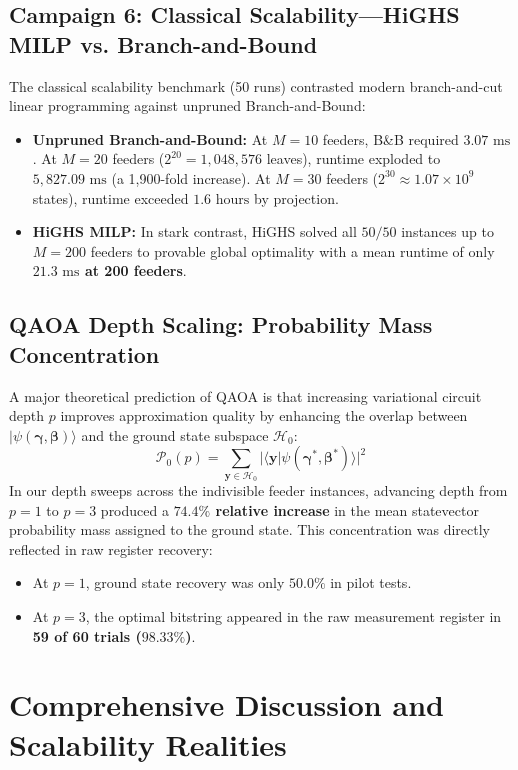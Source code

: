 \documentclass[11pt,a4paper]{article}
\theoremstyle{definition}
\theoremstyle{remark}
\begin{document}
\subsection{Campaign 6: Classical Scalability---HiGHS MILP vs. Branch-and-Bound}
The classical scalability benchmark (50 runs) contrasted modern branch-and-cut linear programming against unpruned Branch-and-Bound:
\begin{itemize}
    \item \textbf{Unpruned Branch-and-Bound:} At $M = 10$ feeders, B\&B required $3.07\text{ ms}$. At $M = 20$ feeders ($2^{20} = 1,048,576$ leaves), runtime exploded to $5,827.09\text{ ms}$ (a 1,900-fold increase). At $M = 30$ feeders ($2^{30} \approx 1.07 \times 10^9$ states), runtime exceeded $1.6\text{ hours}$ by projection.
    \item \textbf{HiGHS MILP:} In stark contrast, HiGHS solved all $50/50$ instances up to $M = 200$ feeders to provable global optimality with a mean runtime of only \textbf{$21.3\text{ ms}$ at 200 feeders}.
\end{itemize}

\subsection{QAOA Depth Scaling: Probability Mass Concentration}
A major theoretical prediction of QAOA is that increasing variational circuit depth $p$ improves approximation quality by enhancing the overlap between $|\psi(\boldsymbol{\gamma}, \boldsymbol{\beta})\rangle$ and the ground state subspace $\mathcal{H}_0$:
\begin{equation}
\mathcal{P}_0(p) = \sum_{\mathbf{y} \in \mathcal{H}_0} |\langle \mathbf{y} | \psi(\boldsymbol{\gamma}^*, \boldsymbol{\beta}^*) \rangle|^2
\end{equation}
In our depth sweeps across the indivisible feeder instances, advancing depth from $p = 1$ to $p = 3$ produced a \textbf{$74.4\%$ relative increase} in the mean statevector probability mass assigned to the ground state. This concentration was directly reflected in raw register recovery:
\begin{itemize}
    \item At $p = 1$, ground state recovery was only $50.0\%$ in pilot tests.
    \item At $p = 3$, the optimal bitstring appeared in the raw measurement register in \textbf{59 of 60 trials ($98.33\%$)}.
\end{itemize}


\section{Comprehensive Discussion and Scalability Realities}
\label{sec:discussion}
\end{document}
